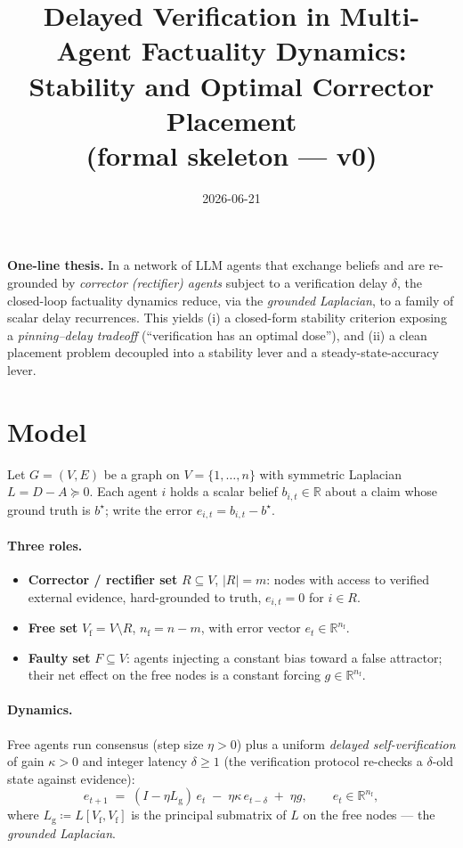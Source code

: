 \documentclass[11pt]{article}
\title{Delayed Verification in Multi-Agent Factuality Dynamics:\\
Stability and Optimal Corrector Placement\\[2pt]
\large(formal skeleton --- v0)}
\author{}
\date{2026-06-21}
\theoremstyle{definition}
\newcommand{\R}{\mathbb{R}}
\newcommand{\Lg}{L_{\mathrm g}}
\begin{document}
\maketitle

\noindent\textbf{One-line thesis.} In a network of LLM agents that exchange beliefs and are
re-grounded by \emph{corrector (rectifier) agents} subject to a verification delay $\delta$,
the closed-loop factuality dynamics reduce, via the \emph{grounded Laplacian}, to a family of
scalar delay recurrences. This yields (i) a closed-form stability criterion exposing a
\emph{pinning--delay tradeoff} (``verification has an optimal dose''), and (ii) a clean
placement problem decoupled into a stability lever and a steady-state-accuracy lever.

\section{Model}

Let $G=(V,E)$ be a graph on $V=\{1,\dots,n\}$ with symmetric Laplacian $L=D-A\succeq 0$.
Each agent $i$ holds a scalar belief $b_{i,t}\in\R$ about a claim whose ground truth is
$b^\star$; write the error $e_{i,t}=b_{i,t}-b^\star$.

\paragraph{Three roles.}
\begin{itemize}
  \item \textbf{Corrector / rectifier set} $R\subseteq V$, $|R|=m$: nodes with access to verified
        external evidence, hard-grounded to truth, $e_{i,t}=0$ for $i\in R$.
  \item \textbf{Free set} $V_{\mathrm f}=V\setminus R$, $n_{\mathrm f}=n-m$, with error vector
        $e_t\in\R^{n_{\mathrm f}}$.
  \item \textbf{Faulty set} $F\subseteq V$: agents injecting a constant bias toward a false
        attractor; their net effect on the free nodes is a constant forcing $g\in\R^{n_{\mathrm f}}$.
\end{itemize}

\paragraph{Dynamics.} Free agents run consensus (step size $\eta>0$) plus a uniform
\emph{delayed self-verification} of gain $\kappa>0$ and integer latency $\delta\ge 1$ (the
verification protocol re-checks a $\delta$-old state against evidence):
\begin{equation}\label{eq:dyn}
  e_{t+1} \;=\; (I-\eta \Lg)\,e_t \;-\; \eta\kappa\, e_{t-\delta} \;+\; \eta g,
  \qquad e_t\in\R^{n_{\mathrm f}},
\end{equation}
where $\Lg \coloneqq L[V_{\mathrm f},V_{\mathrm f}]$ is the principal submatrix of $L$ on the
free nodes --- the \emph{grounded Laplacian}.
\end{document}
